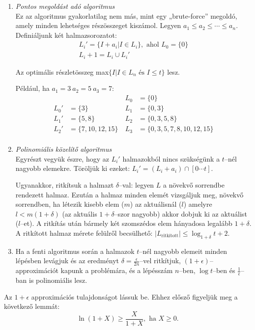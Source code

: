 \begin{enumerate}
  \item \emph{Pontos megoldást adó algoritmus}\\
Ez az algoritmus gyakorlatilag nem más, mint egy „brute-force” megoldó, amely
minden lehetséges részösszeget kiszámol. Legyen $a_1 \leq a_2 \leq \cdots \leq
a_n$. Definiáljunk két halmazsorozatot:
\begin{align*}
L_i' = \{ I + a_i | I \in L_i\}, \mbox{ ahol } L_0 = \{ 0\} \\
L_i+1=L_i \cup L_i'
\end{align*} 

Az optimális részletösszeg max$\{I|I \in L_n \mbox{ és } I \leq t\}$ lesz.

Például, ha $a_1=3~a_2=5~a_3=7$:
{ 
\begin{align*}
    &&~L_0 &= \{ 0 \} \\
L_0'&= \{ 3 \} &~ L_1 &= \{ 0, 3\} \\
L_1'&= \{ 5,8 \} &~ L_2 &= \{ 0, 3, 5, 8\} \\
L_2'&= \{ 7, 10, 12, 15 \} &~ L_3 &= \{ 0, 3, 5, 7, 8, 10, 12, 15\} \\
\end{align*}}  
  \item \emph{Polinomiális közelítő algoritmus} \\
  Egyrészt vegyük észre, hogy az $L_i'$ halmazokból nincs szükségünk a $t$--nél
  nagyobb elemekre. Töröljük ki ezeket: $L_i' = (L_i+a_i) \cap [0 \cdots t]$.
  
  Ugyanakkor, ritkítsuk a halmazt $\delta$--val: legyen $L$ a növekvő sorrendbe
  rendezett halmaz. Ezután a halmaz minden elemét vizsgáljuk meg, növekvő
  sorrendben, ha létezik kisebb elem ($m$) az aktuálisnál ($l$) amelyre
  $l<m(1+\delta)$ (az aktuális $1+\delta$--szor nagyobb) akkor dobjuk ki az
  aktuálist ($l$--et). A ritkítás után bármely két szomszédos elem hányadosa
  legalább $1+\delta$. A ritkított halmaz mérete felülről becsülhető:
  $|L_{\mbox{ritkított}}| \leq \log_{1+\delta}{t+2}$.
  \item Ha a fenti algoritmus során a halmazok $t$--nél nagyobb elemeit minden
  lépésben levágjuk és az eredményt $\delta = \frac{\epsilon}{2n}$--vel
  ritkítjuk, $(1+\epsilon)$--approximációt kapunk a problémára, és a lépésszám
  $n$--ben, $\log t$--ben és $\frac{1}{\epsilon}$--ban is polinomiális lesz.
\end{enumerate}

Az $1+\epsilon$ approximációs tulajdonságot lássuk be. Ehhez elősző figyeljük
meg a következő lemmát:
\[ \ln{(1+X)} \geq \frac{X}{1+X}, \mbox{ ha } X \geq 0.\]


